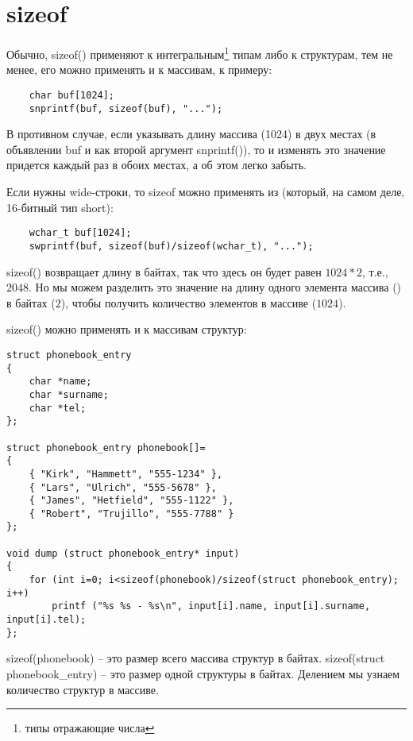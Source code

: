 ﻿\section{sizeof}

Обычно, sizeof() применяют к интегральным\footnote{типы отражающие числа} типам либо к структурам, 
тем не менее, его можно применять и к массивам, к примеру:


\begin{lstlisting}
	char buf[1024];
	snprintf(buf, sizeof(buf), "...");
\end{lstlisting}

В противном случае, если указывать длину массива (1024) в двух местах (в объявлении buf и как второй 
аргумент snprintf()), то и изменять это значение придется каждый раз в обоих местах, а об этом легко забыть.

Если нужны wide-строки, то sizeof можно применять из  (который, на самом деле, 16-битный тип short):

\begin{lstlisting}
	wchar_t buf[1024];
	swprintf(buf, sizeof(buf)/sizeof(wchar_t), "...");
\end{lstlisting}

sizeof() возвращает длину в байтах, так что здесь он будет равен $1024*2$, т.е., $2048$. Но мы можем
разделить это значение на длину одного элемента массива () в байтах ($2$), 
чтобы получить количество элементов в массиве ($1024$).

sizeof() можно применять и к массивам структур:

\begin{lstlisting}
struct phonebook_entry
{
	char *name;
	char *surname;
	char *tel;
};

struct phonebook_entry phonebook[]=
{
	{ "Kirk", "Hammett", "555-1234" },
	{ "Lars", "Ulrich", "555-5678" },
	{ "James", "Hetfield", "555-1122" },
	{ "Robert", "Trujillo", "555-7788" }
};

void dump (struct phonebook_entry* input)
{
	for (int i=0; i<sizeof(phonebook)/sizeof(struct phonebook_entry); i++)
		printf ("%s %s - %s\n", input[i].name, input[i].surname, input[i].tel);
};
\end{lstlisting}

sizeof(phonebook) -- это размер всего массива структур в байтах. sizeof(struct phonebook\_entry) -- 
это размер одной структуры в байтах.
Делением мы узнаем количество структур в массиве.

